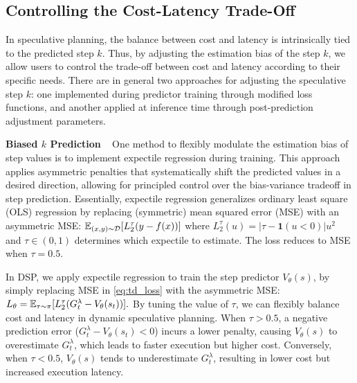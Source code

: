 \subsection{Controlling the Cost-Latency Trade-Off}
\label{sec_4.3}
In speculative planning, the balance between cost and latency is intrinsically tied to the predicted step $k$.
Thus, by adjusting the estimation bias of the step $k$, we allow users to control the trade-off between cost and latency according to their specific needs.
There are in general two approaches for adjusting the speculative step $k$: one implemented during predictor training through modified loss functions, and another applied at inference time through post-prediction adjustment parameters.

\textbf{Biased $k$ Prediction} ~ One method to flexibly modulate the estimation bias of step values is to implement expectile regression \citep{kostrikov2022offline} during training. This approach applies asymmetric penalties that systematically shift the predicted values in a desired direction, allowing for principled control over the bias-variance tradeoff in step prediction.
Essentially, expectile regression generalizes ordinary least square (OLS) regression by replacing (symmetric) mean squared error (MSE) with an asymmetric MSE: $\mathbb{E}_{(x,y) \sim {\mathcal{D}}}[L^{\tau}_2 (y - f(x))]$
where $L^{\tau}_2(u) = |\tau - \mathbf{1}(u < 0)| u^2$ and $\tau \in (0,1)$ determines which expectile to estimate.
The loss reduces to MSE when $\tau=0.5$.

In DSP, we apply expectile regression to train the step predictor $V_{\theta}(s)$, by simply replacing MSE in \cref{eq:td_loss} with the asymmetric MSE: $\label{eq:td_asymmetric_loss}
L_{\theta} = \mathbb{E}_{\tau \sim \pi} [L^{\tau}_2(G_t^\lambda - V_{\theta}(s_t))].$
By tuning the value of $\tau$, we can flexibly balance cost and latency in dynamic speculative planning.
When $\tau > 0.5$, a negative prediction error ($G_t^\lambda - V_{\theta}(s_t) < 0$) incurs a lower penalty, causing $V_{\theta}(s)$ to overestimate $G_t^\lambda$, which leads to faster execution but higher cost.
Conversely, when $\tau < 0.5$, $V_{\theta}(s)$ tends to underestimate $G_t^\lambda$, resulting in lower cost but increased execution latency.

